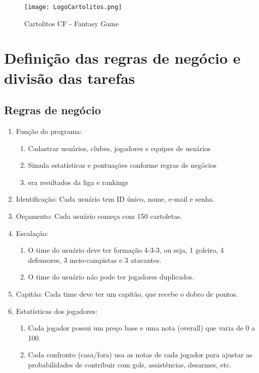 \documentclass[12pt]{article}
\begin{document}
\begin{figure}[H]
  \centering
  \texttt{[image: LogoCartolitos.png]}
  \caption{Cartolitos CF - Fantasy Game}
  \label{fig:cartolitos}
\end{figure}


\section{Definição das regras de negócio e divisão das tarefas}
\label{sec:regras}

\subsection{Regras de negócio}

\begin{enumerate}
  \item Função do programa:
        \begin{enumerate}
          \item Cadastrar usuários, clubes, jogadores e equipes de usuários
          \item Simula estatísticas e pontuações conforme regras de negócios
          \item era resultados da liga e rankings
        \end{enumerate}
  \item Identificação: Cada usuário tem ID único, nome, e-mail e senha.
  \item Orçamento: Cada usuário começa com 150 cartoletas.
  \item Escalação:
        \begin{enumerate}
          \item O time do usuário deve ter formação 4-3-3, ou seja, 1 goleiro, 4 defensores, 3 meio-campistas e 3 atacantes.
          \item O time do usuário não pode ter jogadores duplicados.
        \end{enumerate}
  \item Capitão: Cada time deve ter um capitão, que recebe o dobro de pontos.
  \item Estatísticas dos jogadores:
        \begin{enumerate}
          \item Cada jogador possui um preço base e uma nota (overall) que varia de 0 a 100.
          \item Cada confronto (casa/fora) usa as notas de cada jogador para ajustar as probabilidades de contribuir com gols, assistências, desarmes, etc.

\end{enumerate}
\end{enumerate}
\end{document}

